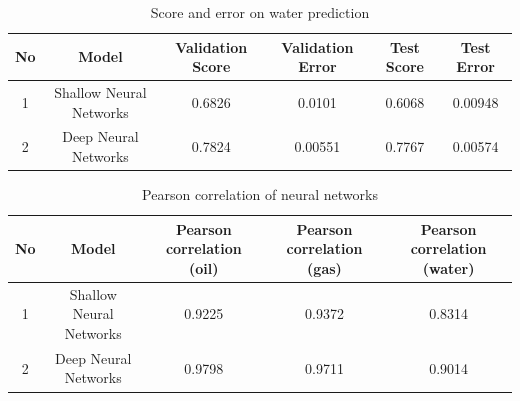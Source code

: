 \documentclass[12pt,a4paper]{report}
\begin{document}
\begin{table}[H]
\caption{Score and error on water prediction}
\centering
\begin{adjustbox}{width=1\textwidth}
\small
\begin{tabular}{|c|c|c|c|c|c|}
\hline
\textbf{No} & \textbf{Model}          & \textbf{Validation Score} & \textbf{Validation Error} & \textbf{Test Score} & \textbf{Test Error} \\ \hline
1           & Shallow Neural Networks & 0.6826                    & 0.0101                    & 0.6068              & 0.00948             \\ \hline
2           & Deep Neural Networks    & 0.7824                    & 0.00551                   & 0.7767              & 0.00574             \\ \hline
\end{tabular}
\end{adjustbox}
\end{table}



\begin{table}[H]
\caption{Pearson correlation of neural networks}
\centering
\begin{adjustbox}{width=1\textwidth}
\small
\begin{tabular}{|c|c|c|c|c|}
\hline
\textbf{No} & \textbf{Model}          & \textbf{Pearson correlation (oil)} & \textbf{Pearson correlation (gas)} & \textbf{Pearson correlation (water)} \\ \hline
1           & Shallow Neural Networks & 0.9225                             & 0.9372                             & 0.8314                               \\ \hline
2           & Deep Neural Networks    & 0.9798                             & 0.9711                             & 0.9014                               \\ \hline
\end{tabular}
\end{adjustbox}
\end{table}
\end{document}
